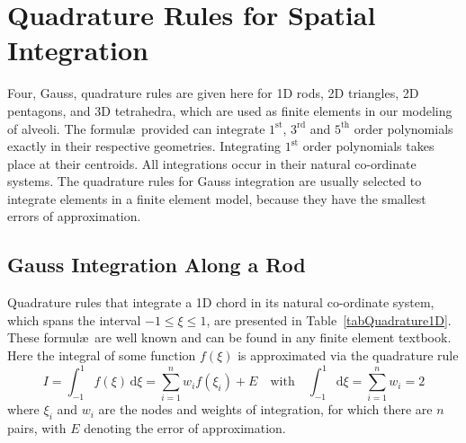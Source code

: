 \section{Quadrature Rules for Spatial Integration}
\label{secGauss}

Four, Gauss, quadrature rules are given here for 1D rods, 2D triangles, 2D pentagons, and 3D tetrahedra, which are used as finite elements in our modeling of alveoli.  The formul\ae\ provided can integrate $1^{\text{st}}$, $3^{\text{rd}}$ and $5^{\text{th}}$ order polynomials exactly in their respective geometries.  Integrating $1^{\text{st}}$ order polynomials takes place at their centroids.  All integrations occur in their natural co-ordinate systems.  The quadrature rules for Gauss integration are usually selected to integrate elements in a finite element model, because they have the smallest errors of approximation.

\subsection{Gauss Integration Along a Rod}

Quadrature rules that integrate a 1D chord in its natural co-ordinate system, which spans the interval $-1 \leq \xi \leq 1$, are presented in Table~\ref{tabQuadrature1D}.  These formul\ae\ are well known and can be found in any finite element textbook.  Here the integral of some function $f( \xi )$ is approximated via the quadrature rule
\begin{equation}
    I = \int_{-1}^1 f ( \xi ) \, \mathrm{d} \xi 
    = \sum_{i=1}^n w_i f( \xi_i ) + E
    \quad \text{with} \quad
    \int_{-1}^1 \mathrm{d} \xi = \sum_{i=1}^n w_i = 2
    \label{Gauss1D}
\end{equation}
where $\xi_i$ and $w_i$ are the nodes and weights of integration, for which there are $n$ pairs, with $E$ denoting the error of approximation.

